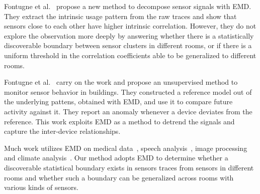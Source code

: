 Fontugne et al.~\cite{IOT} propose a new method to decompose sensor signals with EMD.
They extract the intrinsic usage pattern from the raw traces and show that sensors close to each other have higher intrinsic correlation. However, they do not explore the observation more deeply by answering whether there is a statistically discoverable boundary between sensor clusters in different rooms, or if there is a uniform threshold in the correlation coefficients able to be generalized to different rooms.

Fontugne et al.~\cite{SBS} carry on the work and propose an unsupervised method to monitor sensor behavior in buildings. They constructed 
a reference model out of the underlying pattens, obtained with EMD,  and use it to compare future activity against it.  They report an anomaly whenever a device deviates from the reference. This work exploits EMD as a method to detrend the signals and capture the inter-device relationships.

Much work utilizes EMD on medical data~\cite{ecg}, speech analysis~\cite{speech}, image processing~\cite{ip} 
and climate analysis~\cite{climate}. Our method adopts EMD to determine whether a discoverable statistical boundary exists in sensors traces
from sensors in different rooms and whether such a boundary
 can be generalized across rooms with various kinds of sensors.